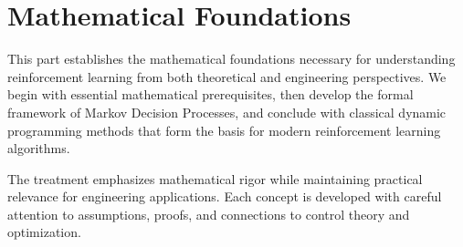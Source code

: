 \part{Mathematical Foundations}

This part establishes the mathematical foundations necessary for understanding reinforcement learning from both theoretical and engineering perspectives. We begin with essential mathematical prerequisites, then develop the formal framework of Markov Decision Processes, and conclude with classical dynamic programming methods that form the basis for modern reinforcement learning algorithms.

The treatment emphasizes mathematical rigor while maintaining practical relevance for engineering applications. Each concept is developed with careful attention to assumptions, proofs, and connections to control theory and optimization.






